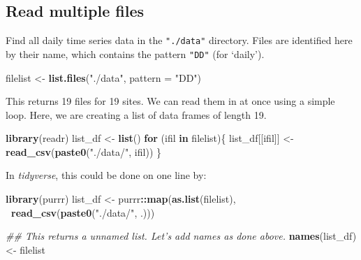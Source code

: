 \documentclass[]{book}
\newenvironment{Shaded}{\begin{snugshade}}{\end{snugshade}}
\newcommand{\CommentTok}[1]{\textcolor[rgb]{0.56,0.35,0.01}{\textit{#1}}}
\newcommand{\ControlFlowTok}[1]{\textcolor[rgb]{0.13,0.29,0.53}{\textbf{#1}}}
\newcommand{\DataTypeTok}[1]{\textcolor[rgb]{0.13,0.29,0.53}{#1}}
\newcommand{\KeywordTok}[1]{\textcolor[rgb]{0.13,0.29,0.53}{\textbf{#1}}}
\newcommand{\NormalTok}[1]{#1}
\newcommand{\OperatorTok}[1]{\textcolor[rgb]{0.81,0.36,0.00}{\textbf{#1}}}
\newcommand{\StringTok}[1]{\textcolor[rgb]{0.31,0.60,0.02}{#1}}
\begin{document}
\hypertarget{read-multiple-files}{%
\subsection{Read multiple files}\label{read-multiple-files}}

Find all daily time series data in the \texttt{"./data"} directory. Files are identified here by their name, which contains the pattern \texttt{"DD"} (for `daily').

\begin{Shaded}
\begin{Highlighting}[]
\NormalTok{filelist <-}\StringTok{ }\KeywordTok{list.files}\NormalTok{(}\StringTok{"./data"}\NormalTok{, }\DataTypeTok{pattern =} \StringTok{"DD"}\NormalTok{)}
\end{Highlighting}
\end{Shaded}

This returns 19 files for 19 sites. We can read them in at once using a simple loop. Here, we are creating a list of data frames of length 19.

\begin{Shaded}
\begin{Highlighting}[]
\KeywordTok{library}\NormalTok{(readr)}
\NormalTok{list_df <-}\StringTok{ }\KeywordTok{list}\NormalTok{()}
\ControlFlowTok{for}\NormalTok{ (ifil }\ControlFlowTok{in}\NormalTok{ filelist)\{}
\NormalTok{  list_df[[ifil]] <-}\StringTok{ }\KeywordTok{read_csv}\NormalTok{(}\KeywordTok{paste0}\NormalTok{(}\StringTok{"./data/"}\NormalTok{, ifil))}
\NormalTok{\}}
\end{Highlighting}
\end{Shaded}

In \emph{tidyverse}, this could be done on one line by:

\begin{Shaded}
\begin{Highlighting}[]
\KeywordTok{library}\NormalTok{(purrr)}
\NormalTok{list_df <-}\StringTok{ }\NormalTok{purrr}\OperatorTok{::}\KeywordTok{map}\NormalTok{(}\KeywordTok{as.list}\NormalTok{(filelist), }\OperatorTok{~}\KeywordTok{read_csv}\NormalTok{(}\KeywordTok{paste0}\NormalTok{(}\StringTok{"./data/"}\NormalTok{, .)))}

\CommentTok{## This returns a unnamed list. Let's add names as done above.}
\KeywordTok{names}\NormalTok{(list_df) <-}\StringTok{ }\NormalTok{filelist}
\end{Highlighting}
\end{Shaded}
\end{document}
